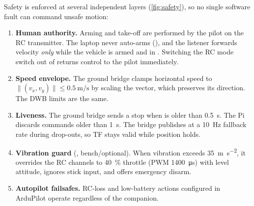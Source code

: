 Safety is enforced at several independent layers (\cref{fig:safety}), so no single
software fault can command unsafe motion:
\begin{enumerate}[leftmargin=*,itemsep=1pt]
  \item \textbf{Human authority.} Arming and take-off are performed by the pilot on
    the RC transmitter. The laptop never auto-arms (), and the
    listener forwards velocity \emph{only} while the vehicle is armed and in
    . Switching the RC mode switch out of  returns control to
    the pilot immediately.
  \item \textbf{Speed envelope.} The ground bridge clamps horizontal speed to
    $\lVert(v_x,v_y)\rVert\le\SI{0.5}{\metre\per\second}$ by scaling the vector,
    which preserves its direction. The DWB limits are the same.
  \item \textbf{Liveness.} The ground bridge sends a stop when  is older
    than \SI{0.5}{\second}. The Pi discards commands older than \SI{1}{\second}. The
    bridge publishes  at a \SI{10}{\hertz} fallback rate during drop-outs,
    so TF stays valid while position holds.
  \item \textbf{Vibration guard} (, bench/optional). When
    vibration exceeds \SI{35}{\metre\per\second\squared}, it overrides the RC channels
    to \SI{40}{\percent} throttle (PWM \SI{1400}{\micro\second}) with level
    attitude, ignores stick input, and offers emergency disarm.
  \item \textbf{Autopilot failsafes.} RC-loss and low-battery actions configured in
    ArduPilot operate regardless of the companion.
\end{enumerate}


